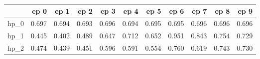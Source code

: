 \begin{tabular}{lrrrrrrrrrr}
\toprule
{} &   ep 0 &   ep 1 &   ep 2 &   ep 3 &   ep 4 &   ep 5 &   ep 6 &   ep 7 &   ep 8 &   ep 9 \\
\midrule
hp\_0 &  0.697 &  0.694 &  0.693 &  0.696 &  0.694 &  0.695 &  0.695 &  0.696 &  0.696 &  0.696 \\
hp\_1 &  0.445 &  0.402 &  0.489 &  0.647 &  0.712 &  0.652 &  0.951 &  0.843 &  0.754 &  0.729 \\
hp\_2 &  0.474 &  0.439 &  0.451 &  0.596 &  0.591 &  0.554 &  0.760 &  0.619 &  0.743 &  0.730 \\
\bottomrule
\end{tabular}
